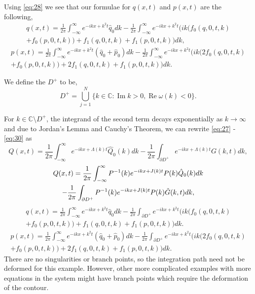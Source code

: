 \documentclass{article}
\begin{document}
Using \eqref{eq:28} we see that our formulae for $q(x,t)$ and $p(x,t)$ are the following,
\begin{multline} \label{eq:29}
    q(x,t) = \frac{1}{2\pi}\int_{-\infty}^{\infty}e^{-ikx+k^2t}\hat{q}_0 dk - \frac{1}{2\pi}\int_{-\infty}^{\infty}e^{-ikx+k^2t}(ik(f_0(q,0,t,k) \\ + f_0(p,0,t,k)) + f_1(q,0,t,k) + f_1(p,0,t,k))dk,
\end{multline}
\begin{multline} \label{eq:30}
    p(x,t) = \frac{1}{2\pi}\int_{-\infty}^{\infty}e^{-ikx+k^2t}(\hat{q}_0 + \hat{p}_0)dk - \frac{1}{2\pi}\int_{-\infty}^{\infty}e^{-ikx+k^2t}(ik(2f_0(q,0,t,k) \\ + f_0(p,0,t,k)) + 2f_1(q,0,t,k) + f_1(p,0,t,k))dk.
\end{multline}

We define the $D^{+}$ to be,
\begin{equation} \label{eq:31}
    D^+ = \bigcup_{j=1}^N\{k \in \mathbb{C}: \operatorname{Im} k > 0, \operatorname{Re} \omega(k) < 0\}.
\end{equation}

For $k \in \mathbb{C} \setminus D^+$, the integrand of the second term decays exponentially as $k \to \infty$ and due to Jordan's Lemma and Cauchy's Theorem, we can rewrite \eqref{eq:27} - \eqref{eq:30} as
\begin{equation} \label{eq:32}
    Q(x,t) = \frac{1}{2\pi}\int_{-\infty}^{\infty}e^{-ikx+\Lambda(k)t}\hat{Q}_0(k)dk - \frac{1}{2\pi}\int_{\partial D^+}e^{-ikx+\Lambda(k)t}G(k,t)dk,
\end{equation}
\begin{multline}\label{eq:33}
    Q(x,t) = \frac{1}{2\pi}\int_{-\infty}^{\infty}P^{-1}(k)e^{-ikx+J(k)t}P(k)\hat{Q}_0(k)dk \\ - \frac{1}{2\pi}\int_{\partial D^+}P^{-1}(k)e^{-ikx+J(k)t}P(k)\Tilde{G}(k,t)dk,
\end{multline}
\begin{multline} \label{eq:34}
    q(x,t) = \frac{1}{2\pi}\int_{-\infty}^{\infty}e^{-ikx+k^2t}\hat{q}_0 dk - \frac{1}{2\pi}\int_{\partial D^+}e^{-ikx+k^2t}(ik(f_0(q,0,t,k) \\ + f_0(p,0,t,k)) + f_1(q,0,t,k) + f_1(p,0,t,k))dk.
\end{multline}
\begin{multline} \label{eq:35}
    p(x,t) = \frac{1}{2\pi}\int_{-\infty}^{\infty}e^{-ikx+k^2t}(\hat{q}_0 + \hat{p}_0)dk - \frac{1}{2\pi}\int_{\partial D^+}e^{-ikx+k^2t}(ik(2f_0(q,0,t,k) \\ + f_0(p,0,t,k)) + 2f_1(q,0,t,k) + f_1(p,0,t,k))dk.
\end{multline}
There are no singularities or branch points, so the integration path need not be deformed for this example. However, other more complicated examples with more equations in the system might have branch points which require the deformation of the contour.
\end{document}
